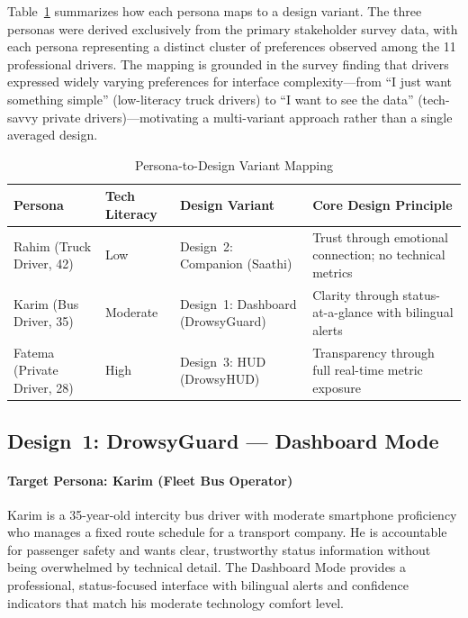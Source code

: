 \documentclass[sigconf]{acmart}
\begin{document}
Table~\ref{tab:persona_design} summarizes how each persona maps to a design variant. The three personas were derived exclusively from the primary stakeholder survey data, with each persona representing a distinct cluster of preferences observed among the 11 professional drivers. The mapping is grounded in the survey finding that drivers expressed widely varying preferences for interface complexity---from ``I just want something simple'' (low-literacy truck drivers) to ``I want to see the data'' (tech-savvy private drivers)---motivating a multi-variant approach rather than a single averaged design.

\begin{table}[h]
\centering
\caption{Persona-to-Design Variant Mapping}
\label{tab:persona_design}
\small
\begin{tabular}{|p{1.4cm}|p{1.2cm}|p{1.6cm}|p{2.8cm}|}
\hline
\textbf{Persona} & \textbf{Tech Literacy} & \textbf{Design Variant} & \textbf{Core Design Principle} \\
\hline
Rahim (Truck Driver, 42) & Low & Design~2: Companion (Saathi) & Trust through emotional connection; no technical metrics \\
\hline
Karim (Bus Driver, 35) & Moderate & Design~1: Dashboard (DrowsyGuard) & Clarity through status-at-a-glance with bilingual alerts \\
\hline
Fatema (Private Driver, 28) & High & Design~3: HUD (DrowsyHUD) & Transparency through full real-time metric exposure \\
\hline
\end{tabular}
\end{table}

\subsection{Design~1: DrowsyGuard --- Dashboard Mode}

\paragraph{Target Persona: Karim (Fleet Bus Operator)}
Karim is a 35-year-old intercity bus driver with moderate smartphone proficiency who manages a fixed route schedule for a transport company. He is accountable for passenger safety and wants clear, trustworthy status information without being overwhelmed by technical detail. The Dashboard Mode provides a professional, status-focused interface with bilingual alerts and confidence indicators that match his moderate technology comfort level.
\end{document}
